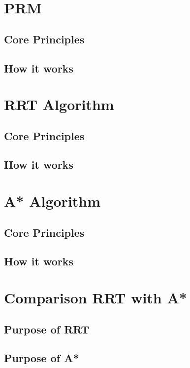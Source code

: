 \section{PRM}

\subsection{Core Principles}

\subsection{How it works}

\section{RRT Algorithm}

\subsection{Core Principles}

\subsection{How it works}

\section{A* Algorithm}

\subsection{Core Principles}

\subsection{How it works}

\section{Comparison RRT with A*}

\subsection{Purpose of RRT}

\subsection{Purpose of A*}

